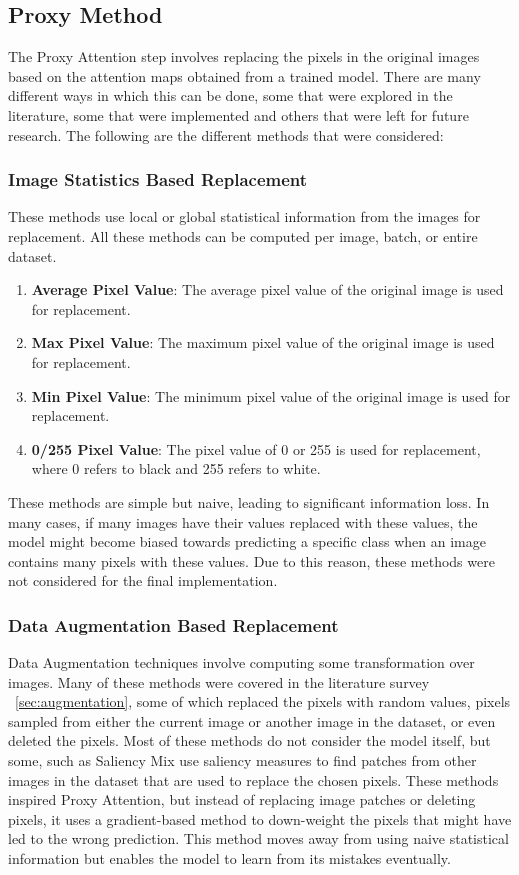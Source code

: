 \subsection{Proxy Method}
The Proxy Attention step involves replacing the pixels in the original images based on the attention maps obtained from a trained model. There are many different ways in which this can be done, some that were explored in the literature, some that were implemented and others that were left for future research. The following are the different methods that were considered:

\subsubsection{Image Statistics Based Replacement}
These methods use local or global statistical information from the images for replacement. All these methods can be computed per image, batch, or entire dataset.

\begin{enumerate}
    \item \textbf{Average Pixel Value}: The average pixel value of the original image is used for replacement.
    \item \textbf{Max Pixel Value}: The maximum pixel value of the original image is used for replacement.
    \item \textbf{Min Pixel Value}: The minimum pixel value of the original image is used for replacement.
    \item \textbf{0/255 Pixel Value}: The pixel value of 0 or 255 is used for replacement, where 0 refers to black and 255 refers to white.
\end{enumerate}
These methods are simple but naive, leading to significant information loss. In many cases, if many images have their values replaced with these values, the model might become biased towards predicting a specific class when an image contains many pixels with these values.
Due to this reason, these methods were not considered for the final implementation.

\subsubsection{Data Augmentation Based Replacement}
Data Augmentation techniques involve computing some transformation over images. Many of these methods were covered in the literature survey ~\ref{sec:augmentation}, some of which replaced the pixels with random values, pixels sampled from either the current image or another image in the dataset, or even deleted the pixels. Most of these methods do not consider the model itself, but some, such as Saliency Mix \cite{uddinSaliencyMixSaliencyGuided2021} use saliency measures to find patches from other images in the dataset that are used to replace the chosen pixels. 
These methods inspired Proxy Attention, but instead of replacing image patches or deleting pixels, it uses a gradient-based method to down-weight the pixels that might have led to the wrong prediction. This method moves away from using naive statistical information but enables the model to learn from its mistakes eventually.

